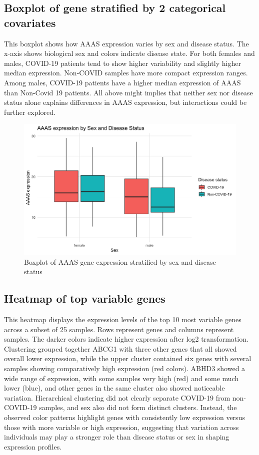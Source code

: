 \documentclass{article}
\begin{document}
\subsection{Boxplot of gene stratified by 2 categorical covariates}

This boxplot shows how AAAS expression varies by sex and disease status. The x-axis shows biological sex and colors indicate disease state. For both females and males, COVID-19 patients tend to show higher variability and slightly higher median expression. Non-COVID samples have more compact expression ranges. Among males, COVID-19 patients have a higher median expression of AAAS than Non-Covid 19 patients. All above might implies that neither sex nor disease status alone explains differences in AAAS expression, but interactions could be further explored.

\begin{figure}[H]
\centering
\includegraphics[width=0.80\linewidth]{AAAS expression by Sex and Disease Status.png}
\caption{\label{fig:boxplot}Boxplot of AAAS gene expression stratified by sex and disease status}
\end{figure}

\subsection{Heatmap of top variable genes}

This heatmap displays the expression levels of the top 10 most variable genes across a subset of 25 samples. Rows represent genes and columns represent samples. The darker colors indicate higher expression after log2 transformation. Clustering grouped together ABCG1 with three other genes that all showed overall lower expression, while the upper cluster contained six genes with several samples showing comparatively high expression (red colors). ABHD3 showed a wide range of expression, with some samples very high (red) and some much lower (blue), and other genes in the same cluster also showed noticeable variation. Hierarchical clustering did not clearly separate COVID-19 from non-COVID-19 samples, and sex also did not form distinct clusters. Instead, the observed color patterns highlight genes with consistently low expression versus those with more variable or high expression, suggesting that variation across individuals may play a stronger role than disease status or sex in shaping expression profiles.
\end{document}
